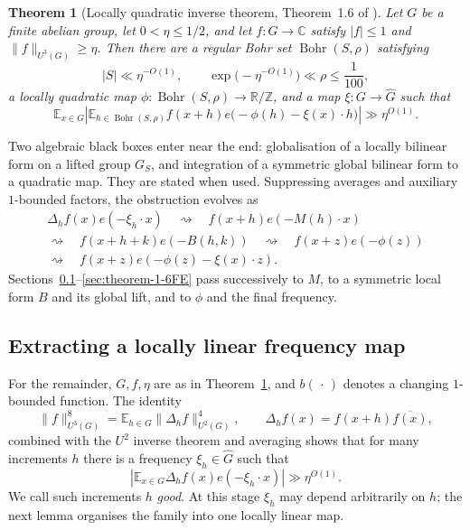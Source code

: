 \documentclass[12pt]{article}
\newtheorem{theorem}{Theorem}
\begin{document}
\begin{theorem}[Locally quadratic inverse theorem, Theorem~1.6 of
\cite{JamneshanTaoFE}]\label{thm:inverse-u3FE}
Let $G$ be a finite abelian group, let $0<\eta\leq1/2$, and let
$f:G\to\mathbb{C}$ satisfy $|f|\leq1$ and $\|f\|_{U^3(G)}\geq\eta$.  Then there
are a regular Bohr set $\operatorname{Bohr}(S,\rho)$ satisfying
\[
 |S|\ll\eta^{-O(1)},
 \qquad
 \exp\bigl(-\eta^{-O(1)}\bigr)\ll\rho\leq\frac{1}{100},
\]
a locally quadratic map
$\phi:\operatorname{Bohr}(S,\rho)\to\mathbb{R}/\mathbb{Z}$, and a map
$\xi:G\to\widehat G$ such that
\[
 \mathbb{E}_{x\in G}
 \left|
  \mathbb{E}_{h\in\operatorname{Bohr}(S,\rho)}
  f(x+h)e\bigl(-\phi(h)-\xi(x)\cdot h\bigr)
 \right|
 \gg\eta^{O(1)}.
\]
\end{theorem}

Two algebraic black boxes enter near the end: globalisation of a locally
bilinear form on a lifted group $G_S$, and integration of a symmetric global
bilinear form to a quadratic map.  They are stated when used.  Suppressing
averages and auxiliary $1$-bounded factors, the obstruction evolves as
\[
\begin{gathered}
 \Delta_hf(x)e(-\xi_h\cdot x)
 \quad\rightsquigarrow\quad
 f(x+h)e(-M(h)\cdot x)\\
 \rightsquigarrow\quad
 f(x+h+k)e(-B(h,k))
 \quad\rightsquigarrow\quad
 f(x+z)e(-\phi(z))\\
 \rightsquigarrow\quad
 f(x+z)e(-\phi(z)-\xi(x)\cdot z).
\end{gathered}
\]
Sections~\ref{sec:lemma-2-5FE}--\ref{sec:theorem-1-6FE} pass successively to
$M$, to a symmetric local form $B$ and its global lift, and to $\phi$ and the
final frequency.

\subsection{Extracting a locally linear frequency map}
\label{sec:lemma-2-5FE}

For the remainder, $G,f,\eta$ are as in Theorem~\ref{thm:inverse-u3FE}, and
$b(\,\cdot\,)$ denotes a changing $1$-bounded function.  The identity
\[
 \|f\|_{U^3(G)}^8
 =\mathbb{E}_{h\in G}\|\Delta_hf\|_{U^2(G)}^4,
 \qquad \Delta_hf(x)=f(x+h)\overline{f(x)},
\]
combined with the $U^2$ inverse theorem and averaging shows that for many
increments $h$ there is a frequency
$\xi_h\in\widehat G$ such that
\[
 \left|\mathbb{E}_{x\in G}
 \Delta_hf(x)e(-\xi_h\cdot x)\right|\gg\eta^{O(1)}.
\]
We call such increments $h$ \emph{good}.  At this stage $\xi_h$ may depend
arbitrarily on $h$; the next lemma organises the family into one locally
linear map.
\end{document}
